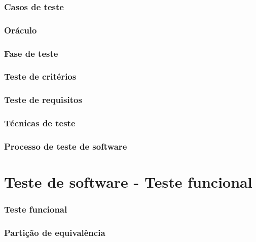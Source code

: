 \documentclass[utf8, usepdftitle=false, svgnames, color={table,
fixpdftex, hyperref, fixinclude, xcdraw}, t, brazil]{beamer}
\begin{document}
 \section{Casos de teste}
 
 
 \section{Oráculo}
 
 
 \section{Fase de teste}
 
 
 \section{Teste de critérios}
 
 
 \section{Teste de requisitos}
 

 \section{Técnicas de teste}
  
 
 \section{Processo de teste de software}
  
 
 \part{Teste de software - Teste funcional}
 
 \section{Teste funcional}
 

 \section{Partição de equivalência}
 
 
\end{document}
